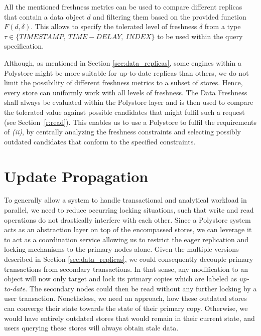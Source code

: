 All the mentioned freshness metrics can be used to compare different replicas that contain a data object $d$ and filtering them based on the provided function $F(d, \delta)$.
This allows to specify the tolerated level of freshness $\delta$ from a type $\tau \in \{TIMESTAMP, \:TIME-DELAY, \:INDEX\}$ to be used within the query specification.

Although, as mentioned in Section \ref{sec:data_replicas}, some engines within a Polystore might be more suitable for up-to-date replicas than others,
we do not limit the possibility of different freshness metrics to a subset of stores. Hence, every store can uniformly work with all levels of freshness.
The Data Freshness shall always be evaluated within the Polystore layer and is then used to compare the tolerated value against possible candidates that might fulfil such a request 
(see Section~\ref{r:read}). This enables us to use a Polystore to fulfil the requirements of \textit{(ii)}, by centrally analyzing the freshness constraints and selecting possibly outdated 
candidates that conform to the specified constraints.







\section{Update Propagation}
\label{sec:propagation}

To generally allow a system to handle transactional and analytical workload in parallel, we need to reduce occurring locking situations,
such that write and read operations do not drastically interfere with each other.
Since a Polystore system acts as an abstraction layer on top of the encompassed stores, we can leverage it to act as a coordination service 
allowing us to restrict the eager replication and locking mechanisms to the primary nodes alone.
Given the multiple versions described in Section \ref{sec:data_replicas}, we could consequently decouple primary transactions from 
secondary transactions. In that sense, any modification to an object will now only target and lock its primary copies which are labeled as \emph{up-to-date}.
The secondary nodes could then be read without any further locking by a user transaction. 
Nonetheless, we need an approach, how these outdated stores can converge their state towards the state of their primary copy.
Otherwise, we would have entirely outdated stores that would remain in their current state, and users querying these stores will always obtain stale data. 


